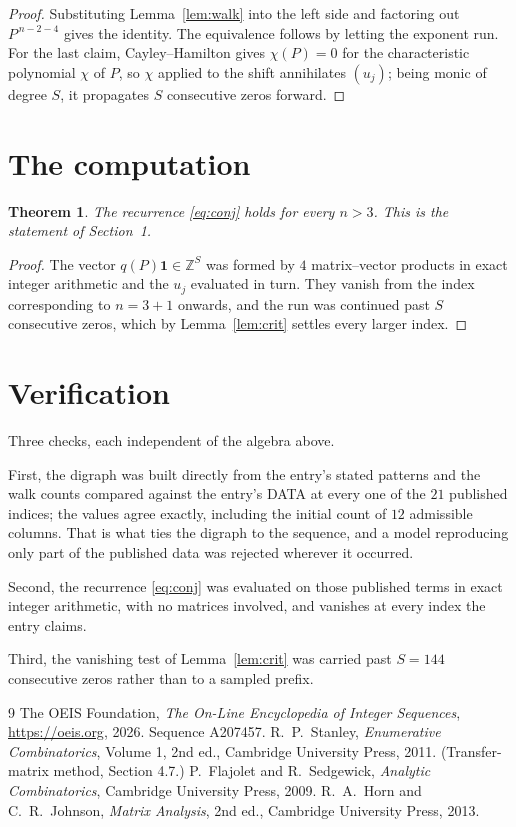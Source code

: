 \documentclass[11pt,a4paper]{article}
\theoremstyle{plain}
\newtheorem{theorem}{Theorem}
\theoremstyle{definition}
\begin{document}
\begin{proof}
Substituting Lemma~\ref{lem:walk} into the left side and factoring out
$P^{\,n-2-4}$ gives the identity. The equivalence follows by letting the exponent
run. For the last claim, Cayley--Hamilton gives $\chi(P)=0$ for the characteristic
polynomial $\chi$ of $P$, so $\chi$ applied to the shift annihilates $(u_j)$; being monic of
degree $S$, it propagates $S$ consecutive zeros forward.
\end{proof}

\section{The computation}

\begin{theorem}
The recurrence \eqref{eq:conj} holds for every $n>3$. This is the statement of
Section~1.
\end{theorem}

\begin{proof}
The vector $q(P)\mathbf{1}\in\mathbb{Z}^{S}$ was formed by $4$ matrix--vector
products in exact integer arithmetic and the $u_j$ evaluated in turn. They vanish from the
index corresponding to $n=3+1$ onwards, and the run was continued past $S$ consecutive
zeros, which by Lemma~\ref{lem:crit} settles every larger index.
\end{proof}

\section{Verification}

Three checks, each independent of the algebra above.

First, the digraph was built directly from the entry's stated patterns and the walk counts
compared against the entry's DATA at every one of the $21$ published indices; the
values agree exactly, including the initial count of $12$ admissible columns. That is
what ties the digraph to the sequence, and a model reproducing only part of the published
data was rejected wherever it occurred.

Second, the recurrence \eqref{eq:conj} was evaluated on those published terms in exact
integer arithmetic, with no matrices involved, and vanishes at every index the entry claims.

Third, the vanishing test of Lemma~\ref{lem:crit} was carried past $S=144$ consecutive
zeros rather than to a sampled prefix.

\begin{thebibliography}{9}
 The OEIS Foundation, \emph{The On-Line Encyclopedia of Integer
Sequences}, \url{https://oeis.org}, 2026. Sequence A207457.
 R.~P.~Stanley, \emph{Enumerative Combinatorics}, Volume 1, 2nd ed.,
Cambridge University Press, 2011. (Transfer-matrix method, Section 4.7.)
 P.~Flajolet and R.~Sedgewick, \emph{Analytic Combinatorics}, Cambridge
University Press, 2009.
 R.~A.~Horn and C.~R.~Johnson, \emph{Matrix Analysis}, 2nd ed., Cambridge
University Press, 2013.
\end{thebibliography}
\end{document}
